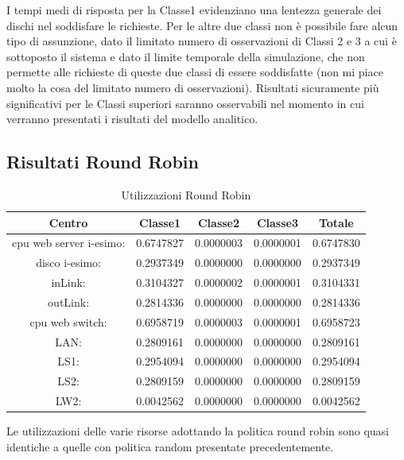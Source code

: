 I tempi medi di risposta per la Classe1 evidenziano una lentezza generale dei dischi nel soddisfare le richieste. Per le altre due classi non è possibile fare alcun tipo di assunzione, dato il limitato numero di osservazioni di Classi 2 e 3 a cui è sottoposto il sistema e dato il limite temporale della simulazione, che non permette alle richieste di queste due classi di essere soddisfatte (non mi piace molto la cosa del limitato numero di osservazioni). Risultati sicuramente più significativi per le Classi superiori saranno osservabili nel momento in cui verranno presentati i risultati del modello analitico.

\subsection{Risultati Round Robin}
\begin{table}[htbp]
\begin{center}
\begin{tabular}{|c|c|c|c|c|}
\hline
Centro &Classe1 &Classe2 &Classe3 &Totale\\
\hline
\hline
 cpu web server i-esimo: 	&0.6747827	&0.0000003	&0.0000001	&0.6747830\\
\hline
 disco i-esimo: 	&0.2937349	&0.0000000	&0.0000000	&0.2937349\\
\hline
 inLink: 	&0.3104327	&0.0000002	&0.0000001	&0.3104331\\
\hline
 outLink: 	&0.2814336	&0.0000000	&0.0000000	&0.2814336\\
\hline
 cpu web switch: 	&0.6958719	&0.0000003	&0.0000001	&0.6958723\\
\hline
 LAN: 	&0.2809161	&0.0000000	&0.0000000	&0.2809161\\
\hline
 LS1: 	&0.2954094	&0.0000000	&0.0000000	&0.2954094\\
\hline
 LS2:	&0.2809159	&0.0000000	&0.0000000	&0.2809159\\
\hline
 LW2: 	&0.0042562	&0.0000000	&0.0000000	&0.0042562\\
\hline
\end{tabular}
\end{center}
\caption{Utilizzazioni Round Robin}
\label{utilizzazioni}
\end{table}
Le utilizzazioni delle varie risorse adottando la politica round robin sono quasi identiche a quelle con politica random presentate precedentemente.
